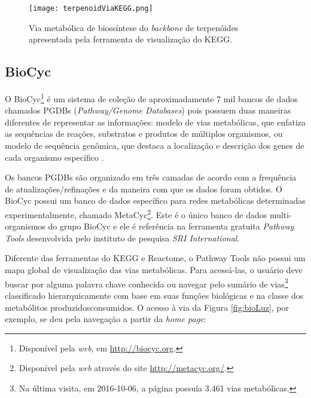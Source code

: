 \begin{figure}[!h]
\centering
\texttt{[image: terpenoidViaKEGG.png]}
\caption{Via metabólica de biossíntese do \textit{backbone} de terpenóides apresentada pela ferramenta de visualização do KEGG.}
\label{terpenoidBackboneKEGG}
\end{figure}


\subsection{BioCyc}

\indent O BioCyc\footnote{Disponível pela \textit{web}, em \url{http://biocyc.org}.} é um sistema de coleção de aproximadamente 7 mil bancos de dados chamados PGDBs (\textit{Pathway/Genome Databases}) pois possuem duas maneiras diferentes de representar as informações: modelo de vias metabólicas, que enfatiza as sequências de reações, substratos e produtos de múltiplos organismos, ou modelo de sequência genômica, que destaca a localização e descrição dos genes de cada organismo específico \cite{biocycIntro}. 

\indent Os bancos PGDBs são organizado em três camadas de acordo com a frequência de atualizações/refinações e da maneira com que os dados foram obtidos. O BioCyc possui um banco de dados específico para redes metabólicas determinadas experimentalmente, chamado MetaCyc\footnote{Disponível pela \textit{web} através do site \url{http://metacyc.org/}.}. Este é o único banco de dados multi-organismos do grupo BioCyc e ele é referência na ferramenta gratuita \textit{Pathway Tools} desenvolvida pelo instituto de pesquisa \textit{SRI International}.

\indent Diferente das ferramentas do KEGG e Reactome, o Pathway  Tools não possui um mapa global de visualização das vias metabólicas. Para acessá-las, o usuário deve buscar por alguma palavra chave conhecida ou navegar pelo sumário de vias\footnote{Na última visita, em 2016-10-06, a página possuía 3.461 vias metabólicas.} classificado hierarquicamente com base em suas funções biológicas e na classe dos metabólitos produzidos\/consumidos. O acesso à via da Figura \ref{fig:bioLuz}, por exemplo, se deu pela navegação a partir da \textit{home page}: \\

